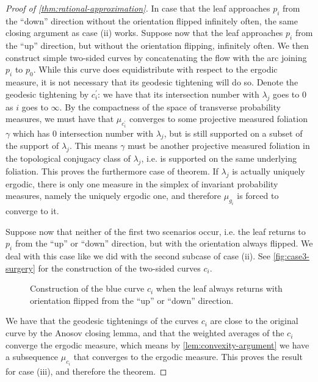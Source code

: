 \documentclass[12pt, reqno]{amsart}
\begin{document}
\begin{proof}[Proof of \autoref{thm:rational-approximation}]
  In case that the leaf approaches $p_i$ from the ``down'' direction without the orientation flipped infinitely often, the same closing argument as case (ii) works.
  Suppose now that the leaf approaches $p_i$ from the ``up'' direction, but without the orientation flipping, infinitely often.
  We then construct simple two-sided curves by concatenating the flow with the arc joining $p_i$ to $p_0$.
  While this curve does equidistribute with respect to the ergodic measure, it is not necessary that its geodesic tightening will do so.
  Denote the geodesic tightening by $c_i^{\prime}$: we have that its intersection number with $\lambda_j$ goes to $0$ as $i$ goes to $\infty$.
  By the compactness of the space of transverse probability measures, we must have that $\mu_{c_i^{\prime}}$ converges to some projective measured foliation $\gamma$ which has $0$ intersection number with $\lambda_j$, but is still supported on a subset of the support of $\lambda_j$.
  This means $\gamma$ must be another projective measured foliation in the topological conjugacy class of $\lambda_j$, i.e. is supported on the same underlying foliation.
  This proves the furthermore case of theorem.
  If $\lambda_j$ is actually uniquely ergodic, there is only one measure in the simplex of invariant probability measures, namely the uniquely ergodic one, and therefore $\mu_{g_i}$ is forced to converge to it.

  Suppose now that neither of the first two scenarios occur, i.e. the leaf returns to $p_i$ from the ``up'' or ``down'' direction, but with the orientation always flipped.
  We deal with this case like we did with the second subcase of case (ii).
  See \autoref{fig:case3-surgery} for the construction of the two-sided curves $c_i$.
  \begin{figure}[h]
    \centering
    \caption{Construction of the blue curve $c_i$ when the leaf always returns with orientation flipped from the ``up'' or ``down'' direction.}
    \label{fig:case3-surgery}
  \end{figure}
  We have that the geodesic tightenings of the curves $c_i$ are close to the original curve by the Anosov closing lemma, and that the weighted averages of the $c_i$ converge the ergodic measure, which means by \autoref{lem:convexity-argument} we have a subsequence $\mu_{c_i}$ that converges to the ergodic measure.
  This proves the result for case (iii), and therefore the theorem.
\end{proof}
\end{document}
